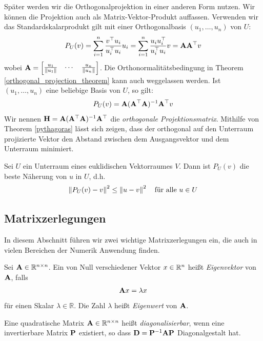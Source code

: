 Später werden wir die Orthogonalprojektion in einer anderen Form nutzen. Wir können die Projektion auch als Matrix-Vektor-Produkt auffassen. Verwenden wir das Standardskalarprodukt gilt mit einer Orthogonalbasis $(u_1, \ldots, u_n)$ von $U$:
\begin{align}
P_U(v) = \sum_{i=1}^n \frac{v^{\top} u_i}{u_i^{\top} u_i} u_i = \sum_{i=1}^n \frac{u_i u_i^{\top}}{u_i^{\top} u_i}v = \mathbf{A} \mathbf{A}^{\top} v
\end{align}
wobei $\mathbf{A} = \begin{bmatrix} \frac{u_1}{\left\lVert u_1 \right\rVert} & \cdots & \frac{u_n}{\left\lVert u_n \right\rVert} \end{bmatrix}$. Die Orthonormalitätsbedingung in Theorem \ref{orthogonal_projection_theorem} kann auch weggelassen werden. Ist $(u_{1},\ldots ,u_{n})$ eine beliebige Basis von $U$, so gilt:
\begin{align}
P_U(v) = \mathbf{A} (\mathbf{A}^\top \mathbf{A})^{-1} \mathbf{A}^\top v
\end{align}
Wir nennen $\mathbf{H} = \mathbf{A} (\mathbf{A}^\top \mathbf{A})^{-1} \mathbf{A}^\top$ die \textit{orthogonale Projektionsmatrix}. Mithilfe von Theorem \ref{pythagoras} lässt sich zeigen, dass der orthogonal auf den Unterraum projizierte Vektor den Abstand zwischen dem Ausgangsvektor und dem Unterraum minimiert.

\begin{thm}
Sei $U$ ein Unterraum eines euklidischen Vektorraumes $V$. Dann ist $P_U(v)$ die beste Näherung von $u$ in $U$, d.h.
$$\left\lVert P_U(v) - v \right\rVert^2 \leq \left\lVert u - v \right\rVert^2 \quad \text{für alle } u \in U$$
\end{thm}


\subsection{Matrixzerlegungen}

In diesem Abschnitt führen wir zwei wichtige Matrixzerlegungen ein, die auch in vielen Bereichen der Numerik Anwendung finden.

\begin{defn}
Sei $\mathbf{A} \in \mathbb{R}^{n \times n}$. Ein von Null verschiedener Vektor $x \in \mathbb{R}^n$ heißt \textit{Eigenvektor} von $\mathbf{A}$, falls
$$\mathbf{A}x = \lambda x$$
für einen Skalar $\lambda \in \mathbb{R}$. Die Zahl $\lambda$ heißt \textit{Eigenwert} von $\mathbf{A}$.
\end{defn}

\begin{defn}
Eine quadratische Matrix $\mathbf{A} \in \mathbb{R}^{n \times n}$ heißt \textit{diagonalisierbar}, wenn eine invertierbare Matrix $\mathbf{P}$ existiert, so dass $\mathbf{D} = \mathbf{P}^{-1}\mathbf{A}\mathbf{P}$ Diagonalgestalt hat.
\end{defn}

